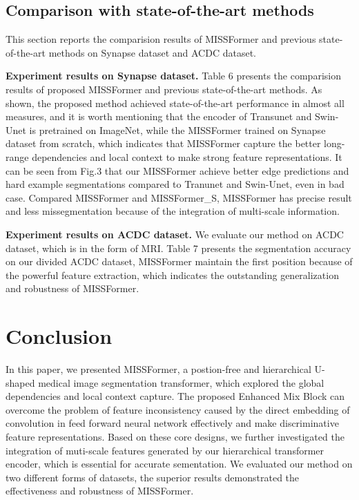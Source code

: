 \documentclass[letterpaper]{article} \usepackage{aaai22}  \usepackage{times}  \usepackage{helvet}  \usepackage{courier}  \usepackage[hyphens]{url}  \usepackage{graphicx} \urlstyle{rm} \def\UrlFont{\rm}  \usepackage{natbib}  \usepackage{caption} \DeclareCaptionStyle{ruled}{labelfont=normalfont,labelsep=colon,strut=off} \frenchspacing  \setlength{\pdfpagewidth}{8.5in}  \setlength{\pdfpageheight}{11in}  \usepackage{algorithm}
\begin{document}
\subsection{Comparison with state-of-the-art methods }
This section reports the comparision results of MISSFormer and previous state-of-the-art methods on Synapse dataset and ACDC dataset. 

\textbf{Experiment results on Synapse dataset.} Table 6 presents the comparision results of proposed MISSFormer and previous state-of-the-art methods. As shown, the proposed method achieved state-of-the-art performance in almost all measures, and it is worth mentioning that the encoder of Transunet and Swin-Unet is pretrained on ImageNet, while the MISSFormer trained on Synapse dataset from scratch, which indicates that MISSFormer capture the better long-range dependencies and local context to make strong feature representations. It can be seen from Fig.3 that our MISSFormer achieve better edge predictions and hard example segmentations compared to Tranunet and Swin-Unet, even in bad case. Compared MISSFormer and MISSFormer\_S, MISSFormer has precise result and less missegmentation because of the integration of multi-scale information. 

\textbf{Experiment results on ACDC dataset.} We evaluate our method on ACDC dataset, which is in the form of MRI. Table 7 presents the segmentation accuracy on our divided ACDC dataset, MISSFormer maintain the first position because of the powerful feature extraction, which indicates the outstanding generalization and robustness of MISSFormer. 

\section{Conclusion}
In this paper, we presented MISSFormer, a postion-free and hierarchical U-shaped medical image segmentation transformer, which explored the global dependencies and local context capture. The proposed Enhanced Mix Block can overcome the problem of feature inconsistency caused by the direct embedding of convolution in feed forward neural network effectively and make discriminative feature representations. Based on these core designs, we further investigated the integration of muti-scale features generated by our hierarchical transformer encoder, which is essential for accurate sementation. We evaluated our method on two different forms of datasets, the superior results demonstrated the effectiveness and robustness of MISSFormer.


\end{document}
